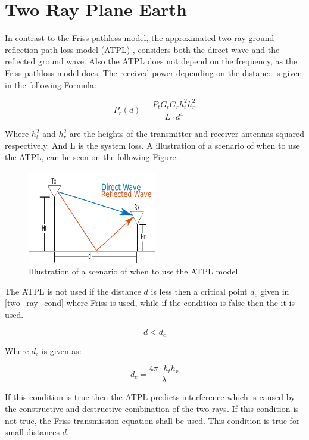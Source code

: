 \section{Two Ray Plane Earth}
In contrast to the Friss pathloss model, the approximated two-ray-ground-reflection path loss model (ATPL) \citep{two_ray}, considers both the direct wave and the reflected ground wave. Also the ATPL does not depend on the frequency, as the Friss pathloss model does. The received power depending on the distance is given in the following Formula:

\begin{equation}
P_r(d) = \frac{P_t G_t G_r h^2_t h^2_r}{L \cdot d^4}
\label{two_ray_model}
\end{equation}

Where $h^2_t$ and $h^2_r$ are the heights of the transmitter and receiver antennas squared respectively. And L is the system loss. A illustration of a scenario of when to use the ATPL, can be seen on the following Figure.

\begin{figure}[H]
\centering
\includegraphics[width=0.5\textwidth]{Figures/two_ray_illu.pdf}
\caption{Illustration of a scenario of when to use the ATPL model}
\label{two_ray_scena}
\end{figure}


The ATPL is not used if the distance $d$ is less then a critical point $d_{c}$ given in \eqref{two_ray_cond} where Friss is used, while if the condition is false then the it is used. 

\begin{equation}
d<d_{c}
\label{two_ray_cond}
\end{equation}

Where $d_{c}$ is given as:

\begin{equation}
d_{c} = \frac{4\pi \cdot h_t h_r}{\lambda}
\label{critical_fac_dc}
\end{equation}

If this condition is true then the ATPL predicts interference which is caused by the constructive and destructive combination of the two rays. If this condition is not true, the Friss transmission equation shall be used. This condition is true for small distances $d$. 

